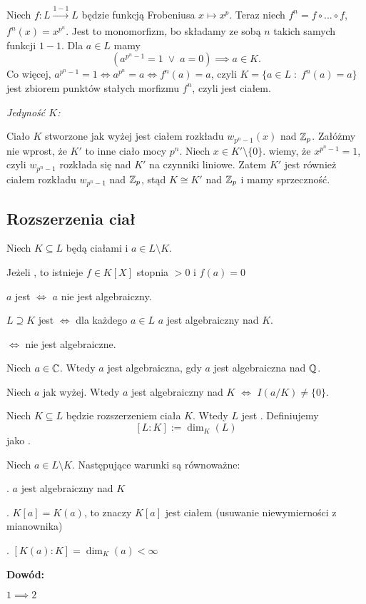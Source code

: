 Niech $f:L\xrightarrow[]{1-1}L$ będzie funkcją Frobeniusa $x\mapsto x^p$. Teraz niech $f^n=f\circ...\circ f$, $f^n(x)=x^{p^n}$. Jest to monomorfizm, bo składamy ze sobą $n$ takich samych funkcji $1-1$. Dla $a\in L$ mamy 
$$(a^{p^n-1}=1\;\lor\;a=0)\implies a\in K.$$
Co więcej, $a^{p^n-1}=1\iff a^{p^n}=a\iff f^n(a)=a$, czyli $K=\{a\in L\;:\;f^n(a)=a\}$ jest zbiorem punktów stałych morfizmu $f^n$, czyli jest ciałem.

\emph{Jedyność $K$:}

Ciało $K$ stworzone jak wyżej jest ciałem rozkładu $w_{p^n-1}(x)$ nad $\mathbb{Z}_p$. Załóżmy nie wprost, że $K'$ to inne ciało mocy $p^n$. Niech $x\in K'\setminus\{0\}$. wiemy, że $x^{p^n-1}=1$, czyli $w_{p^n-1}$ rozkłada się nad $K'$ na czynniki liniowe. Zatem $K'$ jest również ciałem rozkładu $w_{p^n-1}$ nad $\mathbb{Z}_p$, stąd $K\cong K'$ nad $\mathbb{Z}_p$ i mamy sprzeczność.

\subsection{Rozszerzenia ciał}

Niech $K\subseteq L$ będą ciałami i $a\in L\setminus K$.

\indent \point Jeżeli , to istnieje $f\in K[X]$ stopnia $>0$ i $f(a)=0$

\indent \point $a$ jest  $\iff$ $a$ nie jest algebraiczny.

\indent \point {} $L\supseteq K$ jest  $\iff$ dla każdego $a\in L$ $a$ jest algebraiczny nad $K$.

\indent \point {} $\iff$ nie jest algebraiczne.

\indent \point Niech $a\in \mathbb{C}$. Wtedy $a$ jest algebraiczna, gdy $a$ jest algebraiczna nad $\mathbb{Q}$.

\begin{uwaga}
    Niech $a$ jak wyżej. Wtedy $a$ jest algebraiczny nad $K$ $\iff$ $I(a/K)\neq\{0\}$.
\end{uwaga}

Niech $K\subseteq L$ będzie rozszerzeniem ciała $K$. Wtedy $L$ jest . Definiujemy
$$[L:K]:=\dim_K(L)$$
jako .

\begin{uwaga}
    Niech $a\in L\setminus K$. Następujące warunki są równoważne:

. $a$ jest algebraiczny nad $K$

. $K[a]=K(a)$, to znaczy $K[a]$ jest ciałem (usuwanie niewymierności z mianownika)

. $[K(a):K]=\dim_K(a)<\infty$
\end{uwaga}

\textbf{Dowód:}

$1\implies2$

